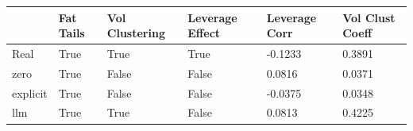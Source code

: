 \begin{tabular}{llllll}
\toprule
 & Fat Tails & Vol Clustering & Leverage Effect & Leverage Corr & Vol Clust Coeff \\
\midrule
Real & True & True & True & -0.1233 & 0.3891 \\
zero & True & False & False & 0.0816 & 0.0371 \\
explicit & True & False & False & -0.0375 & 0.0348 \\
llm & True & True & False & 0.0813 & 0.4225 \\
\bottomrule
\end{tabular}
